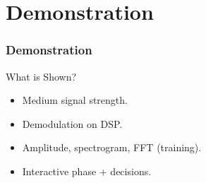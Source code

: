 \section{Demonstration} \label{sec:demonstration}
\begin{frame} \frametitle{Demonstration}
    \begin{block}{What is Shown?}
        \begin{itemize}
        \item Medium signal strength.
        \item Demodulation on DSP.
        \item Amplitude, spectrogram, FFT (training).
        \item Interactive phase $+$ decisions.
        \end{itemize}
    \end{block}
\end{frame}

